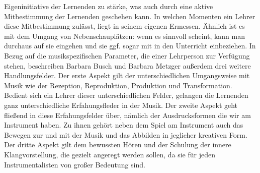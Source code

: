Eigeninitiative der Lernenden zu stärke, was auch durch eine aktive
Mitbestimmung der Lernenden geschehen kann. In welchen Momenten ein Lehrer diese
Mitbestimmung zulässt, liegt in seinem eigenen Ermessen. Ähnlich ist es mit dem
Umgang von Nebenschauplätzen: wenn es sinnvoll scheint, kann man durchaus auf
sie eingehen und sie ggf. sogar mit in den Unterricht einbeziehen. In Bezug auf
die musikspezifischen Parameter, die einer Lehrperson zur Verfügung stehen,
beschreiben Barbara Busch und Barbara Metzger außerdem drei weitere
Handlungsfelder. Der erste Aspekt gilt der unterschiedlichen Umgangsweise mit
Musik wie der Rezeption, Reproduktion, Produktion und Transformation. Bedient
sich ein Lehrer dieser unterschiedlichen Felder, gelangen die Lernenden ganz
unterschiedliche Erfahungsfleder in der Musik. Der zweite Aspekt geht fließend
in diese Erfahungsfelder über, nämlich der Ausdrucksformen die wir am Instrument
haben. Zu ihnen gehört neben dem Spiel am Instrument auch das Bewegen zur und
mit der Musik und das Abbilden in jeglicher kreativen Form. Der dritte Aspekt
gilt dem bewussten Hören und der Schulung der innere Klangvorstellung, die
gezielt angeregt werden sollen, da sie für jeden Instrumentalisten von großer
Bedeutung sind.






